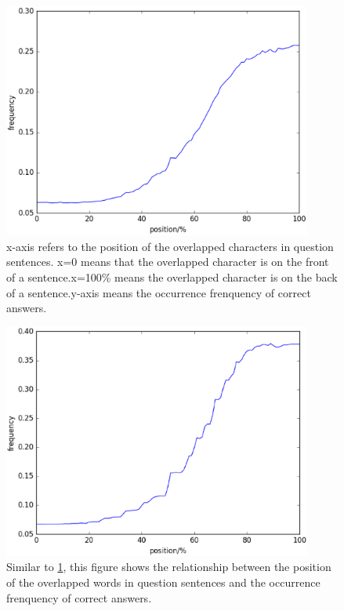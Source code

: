 \documentclass{llncs}
\begin{document}
\begin{figure}
\centering
\includegraphics[width=4in]{figures/character_position.eps}
\caption{x-axis refers to the position of the overlapped characters in question sentences. x=0 means that the overlapped character is on the front of  a sentence.x=100\% means the overlapped character is on the back of a sentence.y-axis means the occurrence frenquency of correct answers.}
\label{fig:character_position}
\end{figure}

\begin{figure}
\centering
\includegraphics[width=4in]{figures/word_position.eps}
\caption{Similar to \ref{fig:character_position}, this figure shows the relationship between the position of the overlapped words in question sentences and the occurrence frenquency of correct answers.}
\label{fig:word_position}
\end{figure}
\end{document}

